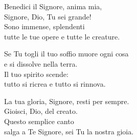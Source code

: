 

\spazio

\strofa Benedici il Signore, anima mia,\\
Signore, Dio, Tu sei grande!\\
Sono immense, splendenti\\
tutte le tue opere e tutte le creature.

\spazio


\spazio

\strofa Se Tu togli il tuo soffio muore ogni cosa\\
e si dissolve nella terra.\\
Il tuo spirito scende:\\
tutto si ricrea e tutto si rinnova.

\spazio


\spazio

\strofa La tua gloria, Signore, resti per sempre.\\
Gioisci, Dio, del creato.\\
Questo semplice canto\\
salga a Te Signore, sei Tu la nostra gioia.

\spazio

